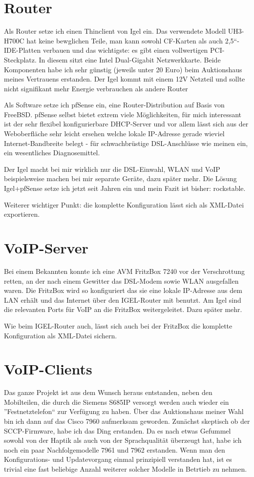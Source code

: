 \documentclass[a4paper,12pt]{scrbook}
\begin{document}
\section{Router}
Als Router setze ich einen Thinclient von Igel ein. Das verwendete Modell UH3-H700C hat keine bewglichen Teile, 
man kann sowohl CF-Karten als auch 2,5``-IDE-Platten verbauen und das wichtigste: es gibt einen vollwertigen PCI-Steckplatz.
In diesem sitzt eine Intel Dual-Gigabit Netzwerkkarte. Beide Komponenten habe ich sehr günstig (jeweils unter 20 Euro) beim
Auktionshaus meines Vertrauens erstanden. Der Igel kommt mit einem 12V Netzteil und sollte nicht signifikant mehr Energie
verbrauchen als andere Router

Als Software setze ich pfSense ein, eine Router-Distribution auf Basis von FreeBSD. pfSense selbst bietet extrem viele Möglichkeiten,
für mich interessant ist der sehr flexibel konfigurierbare DHCP-Server und vor allem lässt sich aus der Weboberfläche sehr leicht
ersehen welche lokale IP-Adresse gerade wieviel Internet-Bandbreite belegt - für schwachbrüstige DSL-Anschlüsse wie meinen ein, ein 
wesentliches Diagnosemittel. 

Der Igel macht bei mir wirklich nur die DSL-Einwahl, WLAN und VoIP beispielsweise machen bei mir separate Geräte, dazu später mehr.
Die Lösung Igel+pfSense setze ich jetzt seit Jahren ein und mein Fazit ist bisher: rockstable.

Weiterer wichtiger Punkt: die komplette Konfiguration lässt sich als XML-Datei exportieren.

\section{VoIP-Server}
Bei einem Bekannten konnte ich eine AVM FritzBox 7240 vor der Verschrottung retten, an der nach einem Gewitter das DSL-Modem sowie 
WLAN ausgefallen waren. Die FritzBox wird so konfiguriert das sie eine lokale IP-Adresse aus dem LAN erhält und das Internet über den
IGEL-Router mit benutzt. Am Igel sind die relevanten Ports für VoIP an die FritzBox weitergeleitet. Dazu später mehr.

Wie beim IGEL-Router auch, lässt sich auch bei der FritzBox die komplette Konfiguration als XML-Datei sichern.


\section{VoIP-Clients}
Das ganze Projekt ist aus dem Wunsch heraus entstanden, neben den Mobilteilen, die durch die Siemens S685IP versorgt werden auch wieder ein
''Festnetztelefon`` zur Verfügung zu haben. Über das Auktionshaus meiner Wahl bin ich dann auf das Cisco 7960 aufmerksam geworden. Zunächst
skeptisch ob der SCCP-Firmware, habe ich das Ding erstanden. Da es nach etwas Gefummel sowohl von der Haptik als auch von der Sprachqualität 
überzeugt hat, habe ich noch ein paar Nachfolgemodelle 7961 und 7962 erstanden. Wenn man den Konfigurations- und Updatevorgang einmal prinzipiell
verstanden hat, ist es trivial eine fast beliebige Anzahl weiterer solcher Modelle in Betrtieb zu nehmen. 
\end{document}
